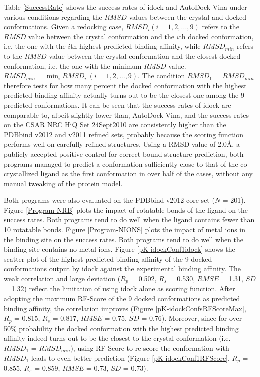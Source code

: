 \documentclass[10pt]{article}
\begin{document}
Table \ref{SuccessRate} shows the success rates of idock and AutoDock Vina under various conditions regarding the $RMSD$ values between the crystal and docked conformations. Given a redocking case, $RMSD_i (i = 1,2,...,9)$ refers to the $RMSD$ value between the crystal conformation and the $i$th docked conformation, i.e. the one with the $i$th highest predicted binding affinity, while $RMSD_{min}$ refers to the $RMSD$ value between the crystal conformation and the closest docked conformation, i.e. the one with the minimum $RMSD$ value. $RMSD_{min} = \displaystyle\min_{i}RMSD_i\ (i = 1,2,...,9)$. The condition $RMSD_1$ = $RMSD_{min}$ therefore tests for how many percent the docked conformation with the highest predicted binding affinity actually turns out to be the closest one among the 9 predicted conformations. It can be seen that the success rates of idock are comparable to, albeit slightly lower than, AutoDock Vina, and the success rates on the CSAR NRC HiQ Set 24Sept2010 are consistently higher than the PDBbind v2012 and v2011 refined sets, probably because the scoring function performs well on carefully refined structures. Using a RMSD value of 2.0\AA, a publicly accepted positive control for correct bound structure prediction, both programs managed to predict a conformation sufficiently close to that of the co-crystallized ligand as the first conformation in over half of the cases, without any manual tweaking of the protein model.

Both programs were also evaluated on the PDBbind v2012 core set ($N$ = 201). Figure \ref{Program-NRB} plots the impact of rotatable bonds of the ligand on the success rates. Both programs tend to do well when the ligand contains fewer than 10 rotatable bonds. Figure \ref{Program-NIONS} plots the impact of metal ions in the binding site on the success rates. Both programs tend to do well when the binding site contains no metal ions. Figure \ref{pK-idockConf1idock} shows the scatter plot of the highest predicted binding affinity of the 9 docked conformations output by idock against the experimental binding affinity. The weak correlation and large deviation ($R_p$ = 0.502, $R_s$ = 0.530, $RMSE$ = 1.31, $SD$ = 1.32) reflect the limitation of using idock alone as scoring function. After adopting the maximum RF-Score of the 9 docked conformations as predicted binding affinity, the correlation improves (Figure \ref{pK-idockConfsRFScoreMax}, $R_p$ = 0.815, $R_s$ = 0.817, $RMSE$ = 0.75, $SD$ = 0.76). Moreover, since for over 50\% probability the docked conformation with the highest predicted binding affinity indeed turns out to be the closest to the crystal conformation (i.e. $RMSD_1$ = $RMSD_{min}$), using RF-Score to re-score the conformation with $RMSD_1$ leads to even better prediction (Figure \ref{pK-idockConf1RFScore}, $R_p$ = 0.855, $R_s$ = 0.859, $RMSE$ = 0.73, $SD$ = 0.73).%
\end{document}
